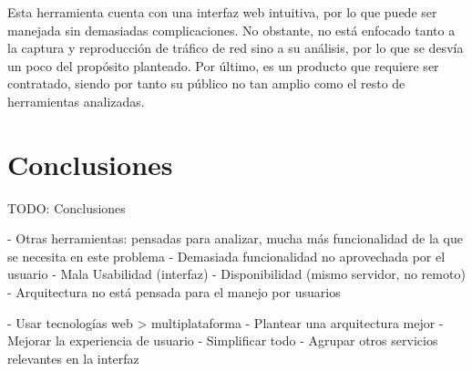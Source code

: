 Esta herramienta cuenta con una interfaz web intuitiva, por lo que puede ser manejada sin demasiadas complicaciones.
No obstante, no está enfocado tanto a la captura y reproducción de tráfico de red sino a su análisis, por lo que se desvía un poco del propósito planteado.
Por último, es un producto que requiere ser contratado, siendo por tanto su público no tan amplio como el resto de herramientas analizadas.

\section{Conclusiones\label{sec:eda:conclusiones}}

TODO: Conclusiones

- Otras herramientas: pensadas para analizar, mucha más funcionalidad de la que se necesita en este problema
- Demasiada funcionalidad no aprovechada por el usuario
- Mala Usabilidad (interfaz)
- Disponibilidad (mismo servidor, no remoto)
  - Arquitectura no está pensada para el manejo por usuarios

- Usar tecnologías web > multiplataforma
- Plantear una arquitectura mejor
- Mejorar la experiencia de usuario
- Simplificar todo
- Agrupar otros servicios relevantes en la interfaz
